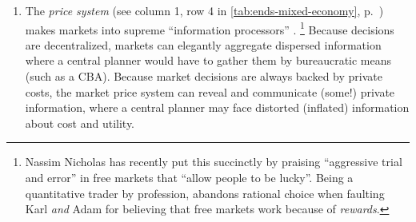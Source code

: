 \begin{enumerate}
	\item
		The \emph{price system} (see column 1, row 4 in \autoref{tab:ends-mixed-economy}, p.~\pageref{tab:ends-mixed-economy}) makes markets into supreme ``information processors'' \citep{Hayek1931}.
		\footnote{
			Nassim Nicholas \citeauthor{Taleb2007} has recently put this succinctly by praising ``aggressive trial and error'' \citeyearpar[xxi]{Taleb2007} in free markets that ``allow people to be lucky''.
			Being a quantitative trader by profession, \citeauthor{Taleb2007} abandons rational choice when faulting Karl \citeauthor{Marx-1867-aa} \emph{and} Adam \citeauthor{Smith-1776-lq} for believing that free markets work because of \emph{rewards}.
		}
		Because decisions are decentralized, markets can elegantly aggregate dispersed information where a central planner would have to gather them by bureaucratic means (such as a \gls{CBA}).
		Because market decisions are always backed by private costs, the market price system can reveal and communicate (some!) private information, where a central planner may face distorted (inflated) information about cost and utility.
\end{enumerate}

